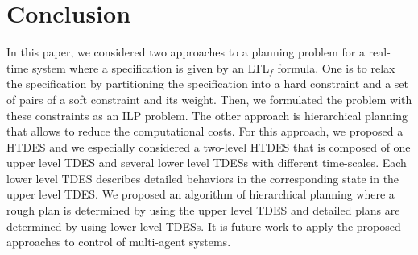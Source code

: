 \documentclass[journal,twoside,web]{IEEEtran}
\begin{document}
\section{Conclusion}
%

In this paper, we considered two approaches to a planning problem for a real-time system where a specification is given by an LTL$_f$ formula.
One is to relax the specification by partitioning the specification into a hard constraint and a set of pairs of a  soft constraint and its weight. 
Then, we formulated the problem with these constraints as an ILP problem.
The other approach is hierarchical planning that allows to reduce the computational costs.
For this approach, we proposed a HTDES and we especially considered a two-level HTDES that is composed of one upper level TDES and several lower level TDESs with different time-scales.
Each lower level TDES describes detailed behaviors in the corresponding state in the upper level TDES.
We proposed an algorithm of hierarchical planning where a rough plan is determined by using the upper level TDES and detailed plans are determined by using lower level TDESs.
%
It is future work to apply the proposed approaches to control of multi-agent systems.
%
%
%
%
\end{document}
